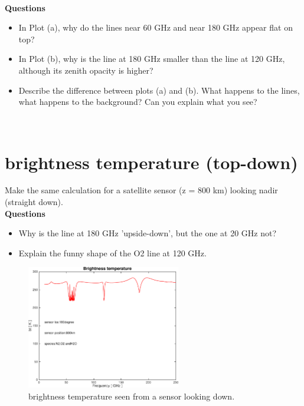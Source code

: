 \documentclass[paper=a4, fontsize=11pt]{scrartcl} %
\begin{document}
\ \\
\textbf{Questions}
\begin{itemize}
	\item In Plot (a), why do the lines near 60 GHz and near 180 GHz appear flat on top?

	\item In Plot (b), why is the line at 180 GHz smaller than the line at 120 GHz, although its zenith opacity is higher?

	\item Describe the difference between plots (a) and (b). What happens to the lines, what happens to the background? Can you explain what you see?
\end{itemize}
\ \\
\section{brightness temperature (top-down)}

Make the same calculation for a satellite sensor (z = 800 km) looking nadir (straight down). \ \\

\textbf{Questions}
\begin{itemize}
	\item Why is the line at 180 GHz 'upside-down', but the one at 20 GHz not?
	\item Explain the funny shape of the O2 line at 120 GHz.
\end{itemize}

\begin{figure}[h]
\centering
 \includegraphics[width=0.6\textwidth]{plots/bt_N2+O2+H2O_800km_180deg.pdf}
 \caption{brightness temperature seen from a sensor looking down. }
\end{figure}
\end{document}
